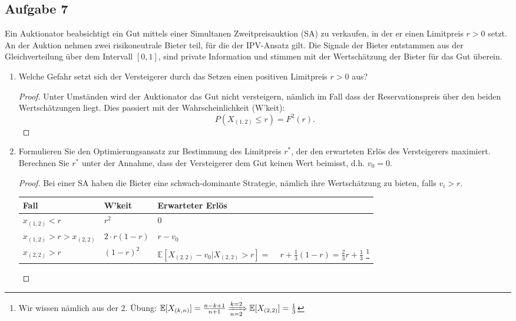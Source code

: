 \documentclass[12pt]{extreport} %
\theoremstyle{named}
\theoremstyle{nnamed}
\theoremstyle{itshape}
\theoremstyle{normal}
\begin{document}
\subsection*{Aufgabe 7}

Ein Auktionator beabsichtigt ein Gut mittels einer Simultanen Zweitpreisauktion (SA) zu verkaufen, in der er einen Limitpreis $r > 0$ setzt. An der Auktion nehmen zwei risikoneutrale Bieter teil, für die der IPV-Ansatz gilt. Die Signale der Bieter entstammen aus der Gleichverteilung über dem Intervall $[0, 1]$, sind private Information und stimmen mit der Wertschätzung der Bieter für das Gut überein.

\begin{enumerate}
	\item Welche Gefahr setzt sich der Versteigerer durch das Setzen einen positiven Limitpreis $r > 0$ aus?
		\begin{proof}
			Unter Umständen wird der Auktionator das Gut nicht versteigern, nämlich im Fall dass der Reservationspreis über den beiden Wertschätzungen liegt. Dies passiert mit der Wahrscheinlichkeit (W'keit):
			$$ P(X_{(1, 2)} \leq r) = F^{2}(r). $$
		\end{proof}
	\item Formulieren Sie den Optimierungsansatz zur Bestimmung des Limitpreis $r^{*}$, der den erwarteten Erlös des Versteigerers maximiert. Berechnen Sie $r^{*}$ unter der Annahme, dass der Versteigerer dem Gut keinen Wert beimisst, d.h. $v_{0} = 0$.
		\begin{proof}
			Bei einer SA haben die Bieter eine schwach-dominante Strategie, nämlich ihre Wertschätzung zu bieten, falls $v_{i} > r$.
			\begin{center}
    \begin{tabular}{| l | l | l |}
    \hline
    Fall & W'keit & Erwarteter Erlös  \\ \hline
    $x_{(1,2)} < r$ & $r^{2}$ & $0$  \\ \hline
    $x_{(1, 2)} > r > x_{(2, 2)} $ & $2 \cdot r (1 - r)$ & $r - v_{0}$  \\ \hline
    $x_{(2, 2)} > r$ & $(1-r)^{2} $  &  \pbox{20cm}{$\mathbb{E}[X_{(2,2)} - v_{0} \big| X_{(2,2)} > r] =$ \\ ~\hspace{0.25cm} $r + \frac{1}{3} (1-r) = \frac{2}{3} r + \frac{1}{3}$} \footnote{Wir wissen nämlich aus der 2. Übung: $\mathbb{E}[X_{(k, n)}] = \frac{n - k +1}{n+1} \xRightarrow[n=2]{k=2} \mathbb{E}[X_{(2,2)}] = \frac{1}{3}$}  \\ 
    \hline
    \end{tabular}
    \end{center}
   

\end{proof}
\end{enumerate}
\end{document}
